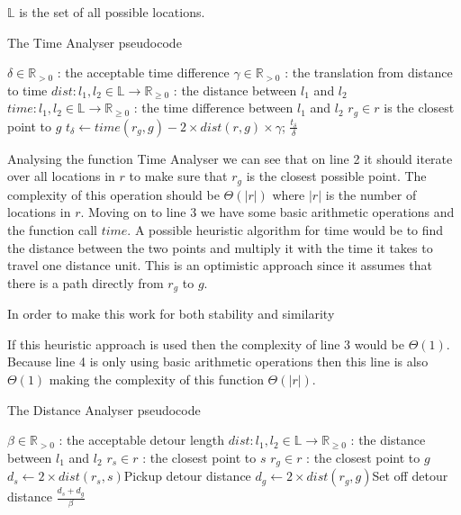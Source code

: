
$\mathbb{L}$ is the set of all possible locations.

\begin{algorithm}
	\caption{The Time Analyser pseudocode}
	\begin{algorithmic}[1]
		\Require 
		\Statex $\delta\in \mathbb{R}_{>0}$ : the acceptable time difference
		\Statex $\gamma\in\mathbb{R}_{>0}$ : the translation from distance to time
		\Statex $dist : l_1,l_2 \in \mathbb{L} \rightarrow \mathbb{R}_{\geq 0}$ : the distance between $l_1$ and $l_2$
		\Statex $time : l_1,l_2 \in \mathbb{L} \rightarrow \mathbb{R}_{\geq 0}$ : the time difference between $l_1$ and $l_2$
		\Statex 
			\State $r_g \in r$ is the closest point to $g$
			\State $t_\delta\gets time(r_g, g) - 2\times dist(r,g)\times\gamma$;
			\State\Return $\frac{t_\delta}{\delta}$
		\EndFunction
	\end{algorithmic}
\end{algorithm}

Analysing the function Time Analyser we can see that on line 2 it should iterate over all locations in $r$ to make sure that $r_g$ is the closest possible point.
The complexity of this operation should be $\Theta(|r|)$ where $|r|$ is the number of locations in $r$.
Moving on to line 3 we have some basic arithmetic operations and the function call $time$.
A possible heuristic algorithm for time would be to find the distance between the two points and multiply it with the time it takes to travel one distance unit. 
This is an optimistic approach since it assumes that there is a path directly from $r_g$ to $g$.

In order to make this work for both stability and similarity

If this heuristic approach is used then the complexity of line 3 would be $\Theta(1)$.
Because line 4 is only using basic arithmetic operations then this line is also $\Theta(1)$ making the complexity of this function $\Theta(|r|)$.

 \begin{algorithm}
	\caption{The Distance Analyser pseudocode}
	\begin{algorithmic}[1]
		\Require 
		\Statex $\beta \in \mathbb{R}_{>0}$ : the acceptable detour length
		\Statex $dist : l_1,l_2 \in \mathbb{L} \rightarrow \mathbb{R}_{\geq 0}$ : the distance between $l_1$ and $l_2$
		\Statex 
			\State $r_s \in r$ : the closest point to $s$
			\State $r_g \in r$ : the closest point to $g$
			\State $d_s\gets 2\times dist(r_s, s)$\Comment Pickup detour distance
			\State $d_g\gets 2\times dist(r_g, g)$\Comment Set off detour distance
			\State\Return $\frac{d_s + d_g}{\beta}$
		\EndFunction
	\end{algorithmic}
\end{algorithm}

